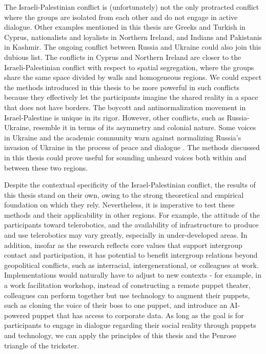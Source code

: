 \documentclass[dissertation,math,vertlayout,pdfa,colorlinks]{aaltoseries}
\begin{document}
The Israeli-Palestinian conflict is (unfortunately) not the only protracted conflict where the groups are isolated from each other and do not engage in active dialogue. Other examples mentioned in this thesis are Greeks and Turkish in Cyprus, nationalists and loyalists in Northern Ireland, and Indians and Pakistanis in Kashmir. The ongoing conflict between Russia and Ukraine could also join this dubious list. The conflicts in Cyprus and Northern Ireland are closer to the Israeli-Palestinian conflict with respect to spatial segregation, where the groups share the same space divided by walls and homogeneous regions. We could expect the methods introduced in this thesis to be more powerful in such conflicts because they effectively let the participants imagine the shared reality in a space that does not have borders. The boycott and antinormalization movement in Israel-Palestine is unique in its rigor. However, other conflicts, such as Russia-Ukraine, resemble it in terms of its asymmetry and colonial nature. Some voices in Ukraine and the academic community warn against normalizing Russia's invasion of Ukraine in the process of peace and dialogue \cite{makarychevNormalizeRationalizeIntellectuals2023}. The methods discussed in this thesis could prove useful for sounding unheard voices both within and between these two regions. 

Despite the contextual specificity of the Israel-Palestinian conflict, the results of this thesis stand on their own, owing to the strong theoretical and empirical foundation on which they rely. Nevertheless, it is imperative to test these methods and their applicability in other regions. For example, the attitude of the participants toward telerobotics, and the availability of infrastructure to produce and use telerobotics may vary greatly, especially in under-developed areas. In addition, insofar as the research reflects core values that support intergroup contact and participation, it has potential to benefit intergroup relations beyond geopolitical conflicts, such as interracial, intergenerational, or colleagues at work. Implementations would naturally have to adjust to new contexts - for example, in a work facilitation workshop, instead of constructing a remote puppet theater, colleagues can perform together but use technology to augment their puppets, such as cloning the voice of their boss to one puppet, and introduce an AI-powered puppet that has access to corporate data. As long as the goal is for participants to engage in dialogue regarding their social reality through puppets and technology, we can apply the principles of this thesis and the Penrose triangle of the trickster.
\end{document}
